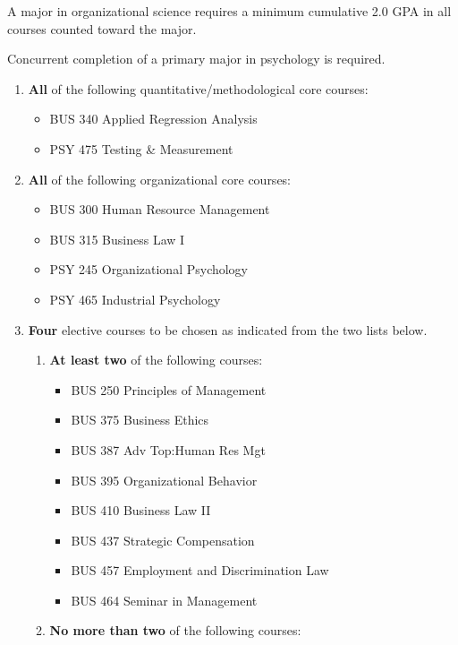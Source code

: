 \documentclass[
  letterpaper,
]{scrbook}
\providecommand{\tightlist}{%
  \setlength{\itemsep}{0pt}\setlength{\parskip}{0pt}}
\begin{document}
A major in organizational science requires a minimum cumulative 2.0 GPA
in all courses counted toward the major.

Concurrent completion of a primary major in psychology is required.

\begin{enumerate}
\def\labelenumi{\arabic{enumi}.}
\item
  \textbf{All} of the following quantitative/methodological core
  courses:

  \begin{itemize}
  \tightlist
  \item
    BUS 340 Applied Regression Analysis
  \item
    PSY 475 Testing \& Measurement
  \end{itemize}
\item
  \textbf{All} of the following organizational core courses:

  \begin{itemize}
  \tightlist
  \item
    BUS 300 Human Resource Management
  \item
    BUS 315 Business Law I
  \item
    PSY 245 Organizational Psychology
  \item
    PSY 465 Industrial Psychology
  \end{itemize}
\item
  \textbf{Four} elective courses to be chosen as indicated from the two
  lists below.

  \begin{enumerate}
  \def\labelenumii{\alph{enumii}.}
  \tightlist
  \item
    \textbf{At least two} of the following courses:

    \begin{itemize}
    \tightlist
    \item
      BUS 250 Principles of Management
    \item
      BUS 375 Business Ethics
    \item
      BUS 387 Adv Top:Human Res Mgt
    \item
      BUS 395 Organizational Behavior
    \item
      BUS 410 Business Law II
    \item
      BUS 437 Strategic Compensation
    \item
      BUS 457 Employment and Discrimination Law
    \item
      BUS 464 Seminar in Management
    \end{itemize}
  \item
    \textbf{No more than two} of the following courses:


\end{enumerate}
\end{enumerate}
\end{document}
